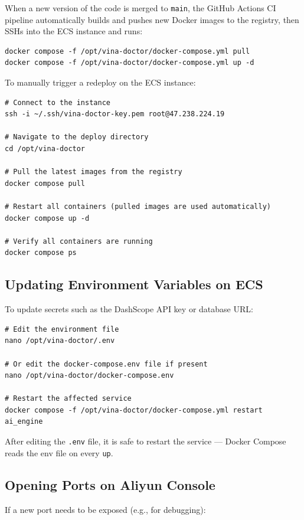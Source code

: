 \documentclass[12pt,a4paper]{article}
\begin{document}
When a new version of the code is merged to \texttt{main}, the GitHub Actions
CI pipeline automatically builds and pushes new Docker images to the registry,
then SSHs into the ECS instance and runs:

\begin{verbatim}
docker compose -f /opt/vina-doctor/docker-compose.yml pull
docker compose -f /opt/vina-doctor/docker-compose.yml up -d
\end{verbatim}

To manually trigger a redeploy on the ECS instance:

\begin{verbatim}
# Connect to the instance
ssh -i ~/.ssh/vina-doctor-key.pem root@47.238.224.19

# Navigate to the deploy directory
cd /opt/vina-doctor

# Pull the latest images from the registry
docker compose pull

# Restart all containers (pulled images are used automatically)
docker compose up -d

# Verify all containers are running
docker compose ps
\end{verbatim}

\subsection{Updating Environment Variables on ECS}

To update secrets such as the DashScope API key or database URL:

\begin{verbatim}
# Edit the environment file
nano /opt/vina-doctor/.env

# Or edit the docker-compose.env file if present
nano /opt/vina-doctor/docker-compose.env

# Restart the affected service
docker compose -f /opt/vina-doctor/docker-compose.yml restart ai_engine
\end{verbatim}

After editing the \texttt{.env} file, it is safe to restart the service —
Docker Compose reads the env file on every \texttt{up}.

\subsection{Opening Ports on Aliyun Console}

If a new port needs to be exposed (e.g., for debugging):
\end{document}

